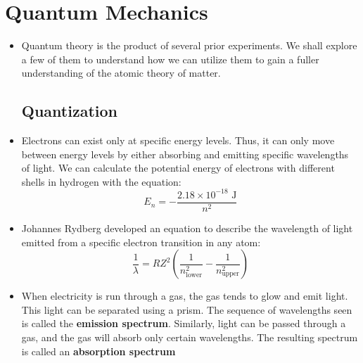 \documentclass{article}
\numberwithin{equation}{section}
\theoremstyle{classic}
\begin{document}
\section{Quantum Mechanics}
\begin{itemize}
    \item Quantum theory is the product of several prior experiments. We shall explore a few of them to understand how we can utilize them to gain a fuller understanding of the atomic theory of matter. 
    \subsection{Quantization}
    \item Electrons can exist only at specific energy levels. Thus, it can only move between energy levels by either absorbing and emitting specific wavelengths of light. We can calculate the potential energy of electrons with different shells in hydrogen with the equation:
    $$
        E_n = -\frac{2.18\times 10^{-18} \text{ J}}{n^2}
    $$
    \item Johannes Rydberg developed an equation to describe the wavelength of light emitted from a specific electron transition in any atom:
    $$
        \frac{1}{\lambda} = RZ^2\left(\frac{1}{n^2_\text{lower}}-\frac{1}{n^2_\text{upper}}\right)
    $$
    \item When electricity is run through a gas, the gas tends to glow and emit light. This light can be separated using a prism. The sequence of wavelengths seen is called the \textbf{emission spectrum}. Similarly, light can be passed through a gas, and the gas will absorb only certain wavelengths. The resulting spectrum is called an \textbf{absorption spectrum}

\end{itemize}
\end{document}
